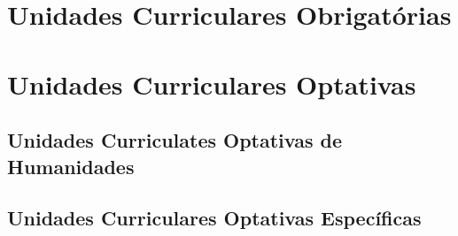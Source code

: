 \chapter{Unidades Curriculares Obrigatórias}
\label{apendices:obrigatorias}



\chapter{Unidades Curriculares Optativas}
\label{apendices:optativas}

\section{Unidades Curriculates Optativas de Humanidades}




\section{Unidades Curriculares Optativas Específicas}


